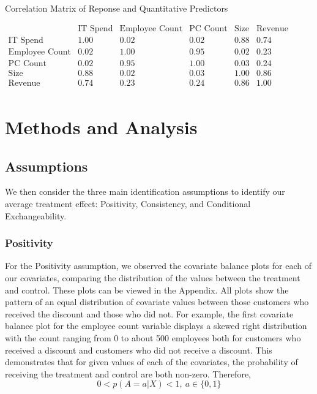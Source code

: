 \documentclass[10pt]{article}
\begin{document}
\begin{table}[ht]
\centering
\caption{Correlation Matrix of Reponse and Quantitative Predictors}\medskip
$
\begin{array}{l|ccccccccc}
                  & \text{IT Spend}    & \text{Employee Count}      & \text{PC Count}  & \text{Size}   & \text{Revenue}  \\ \hline
\text{IT Spend}          & 1.00        & 0.02                       & 0.02             & 0.88          & 0.74  \\
\text{Employee Count}    & 0.02        & 1.00                       & 0.95             & 0.02          & 0.23     \\
\text{PC Count}          & 0.02        & 0.95                       & 1.00             & 0.03          & 0.24     \\
\text{Size}              & 0.88        & 0.02                       & 0.03             & 1.00          & 0.86  \\
\text{Revenue}           & 0.74        & 0.23                       & 0.24             & 0.86          & 1.00     \\
\end{array}
$
\end{table}

\section{Methods and Analysis}
\subsection{Assumptions}

We then consider the three main identification assumptions to identify our average treatment effect: Positivity, Consistency, and Conditional Exchangeability.

\subsubsection{Positivity}

For the Positivity assumption, we observed the covariate balance plots for each of our covariates, comparing the distribution of the values between the treatment and control. These plots can be viewed in the Appendix. All plots show the pattern of an equal distribution of covariate values between those customers who received the discount and those who did not. For example, the first covariate balance plot for the employee count variable displays a skewed right distribution with the count ranging from 0 to about 500 employees both for customers who received a discount and customers who did not receive a discount. This demonstrates that for given values of each of the covariates, the probability of receiving the treatment and control are both non-zero. Therefore,
\[
0<p(A = a|X)<1,\:a\in\{0,1\}
\]
\end{document}
